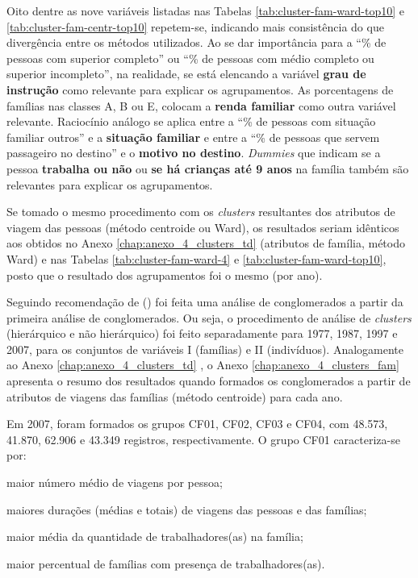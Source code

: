 Oito dentre as nove variáveis listadas nas Tabelas  \ref{tab:cluster-fam-ward-top10} e \ref{tab:cluster-fam-centr-top10} repetem-se, indicando mais consistência do que divergência entre os métodos utilizados. Ao se dar importância para a ``\% de pessoas com superior completo'' ou ``\% de pessoas com médio completo ou superior incompleto'', na realidade, se está elencando a variável \textbf{grau de instrução} como relevante para explicar os agrupamentos. As porcentagens de famílias nas classes A, B ou E, colocam a \textbf{renda familiar} como outra variável relevante.
Raciocínio análogo se aplica entre a ``\% de pessoas com situação familiar outros'' e a \textbf{situação familiar} e entre a ``\% de pessoas que servem passageiro no destino'' e o \textbf{motivo no destino}.
\textit{Dummies} que indicam se a pessoa \textbf{trabalha ou não} ou \textbf{se há crianças até 9 anos} na família também são relevantes para explicar os agrupamentos.

Se tomado o mesmo procedimento com os \textit{clusters} resultantes dos atributos de viagem das pessoas (método centroide ou Ward), os resultados seriam idênticos aos obtidos no Anexo \ref{chap:anexo_4_clusters_td} (atributos de família, método Ward) e nas Tabelas \ref{tab:cluster-fam-ward-4} e \ref{tab:cluster-fam-ward-top10}, posto que o resultado dos agrupamentos foi o mesmo (por ano).

Seguindo recomendação de  (\citeyear{VESPUCCI2003}) foi feita uma análise de conglomerados a partir da primeira análise de conglomerados. Ou seja, o procedimento de análise de \textit{clusters} (hierárquico e não hierárquico) foi feito separadamente para 1977, 1987, 1997 e 2007, para os conjuntos de variáveis I (famílias) e II (indivíduos).
Analogamente ao Anexo \ref{chap:anexo_4_clusters_td} , o Anexo \ref{chap:anexo_4_clusters_fam} apresenta o resumo dos resultados quando formados os conglomerados a partir de atributos de viagens das famílias (método centroide) para cada ano.

Em 2007, foram formados os grupos CF01, CF02, CF03 e CF04, com 48.573, 41.870, 62.906 e 43.349 registros, respectivamente.
O grupo CF01 caracteriza-se por:
\begin{compactitem}
\item maior número médio de viagens por pessoa;
\item maiores durações (médias e totais) de viagens das pessoas e das famílias;
\item maior média da quantidade de trabalhadores(as) na família;
\item maior percentual de famílias com presença de trabalhadores(as).
\end{compactitem}

